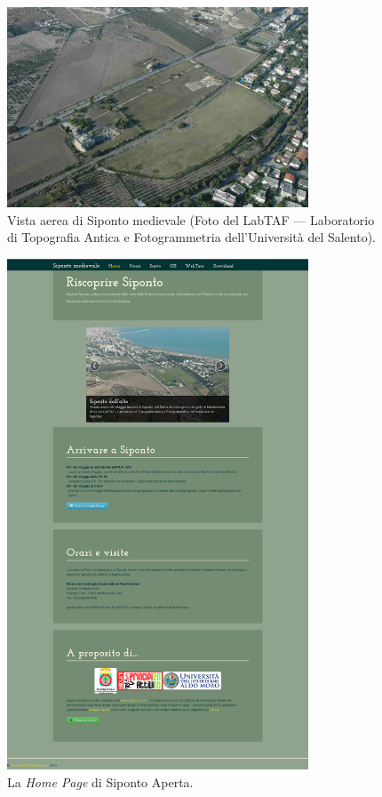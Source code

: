 \documentclass{paper}
\begin{document}
\begin{figure}
    \centering
    \includegraphics[width=0.8\textwidth]{img/sip}
    \caption[Vista aerea di Siponto medievale]{Vista aerea di Siponto medievale (Foto del LabTAF --- Laboratorio di Topografia Antica e Fotogrammetria dell'Università del Salento).}
    \label{fig:sip}
\end{figure}

\begin{figure}
    \centering
    \includegraphics[width=0.8\textwidth]{img/home}
    \caption[\textit{Home page} di Siponto Aperta]{La \textit{Home Page} di Siponto Aperta.}
    \label{fig:home}
\end{figure}
\end{document}

